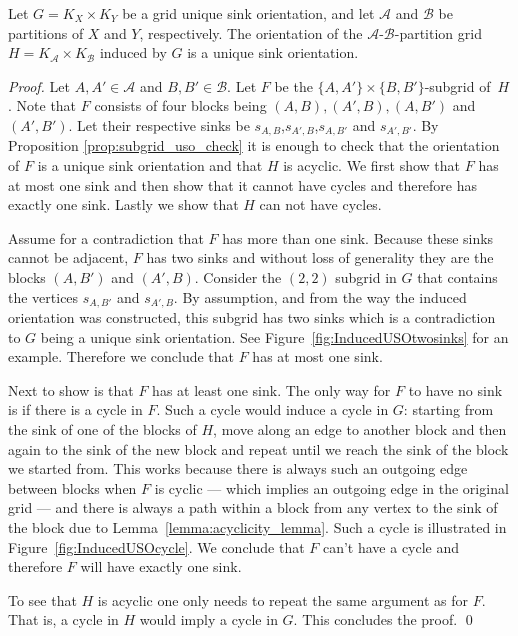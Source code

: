 \documentclass[runningheads,a4paper]{llncs}
\newcommand{\A}{\ensuremath{\mathcal A}}
\newcommand{\B}{\ensuremath{\mathcal B}}
\newcommand{\s}[1]{\ensuremath{s_{\scriptscriptstyle#1}}}
\begin{document}
\begin{lemma}\label{lemma:USO-Lemma}
Let $G = K_X \times K_Y$ be a grid unique sink orientation,
and let $\A$ and $\B$ be partitions of $X$ and $Y$, respectively.
The orientation of the $\A$-$\B$-partition grid $H = K_\A \times K_\B$ induced by $G$ is a unique sink orientation.
\end{lemma}

\begin{proof}
Let $A, A'\in \A$ and $B,B'\in \B$. Let $F$ be the $\{A,A'\}\times\{B, B'\}$-subgrid of~$H$.
Note that $F$ consists of four blocks being $(A,B), (A', B), (A, B')$ and $(A', B')$. Let their respective sinks be $s_{A,B}$,$s_{A',B}$,$s_{A,B'}$ and $s_{A',B'}$.
By Proposition \ref{prop:subgrid_uso_check} it is enough to check that the orientation of $F$ is a unique sink orientation and that $H$ is acyclic.
We first show that $F$ has at most one sink and then show that it cannot have cycles and therefore has exactly one sink. Lastly we show that $H$ can not have cycles.

Assume for a contradiction that $F$ has more than one sink.
Because these sinks cannot be adjacent, $F$ has two sinks and without loss of generality they are the blocks $(A,B')$ and $(A', B)$. Consider the $(2,2)$ subgrid in $G$ that contains the vertices $\s{A,B'}$ and $\s{A',B}$. By assumption, and from the way the induced orientation was constructed, this subgrid has two sinks which is a contradiction to $G$ being a unique sink orientation. See Figure~\ref{fig:InducedUSOtwosinks} for an example. Therefore we conclude that $F$ has at most one sink. 

Next to show is that $F$ has at least one sink. The only way for $F$ to have no sink is if there is a cycle in $F$. Such a cycle would induce a cycle in $G$: starting from the sink of one of the blocks of $H$, move along an edge to another block and then again to the sink of the new block and repeat until we reach the sink of the block we started from. This works because there is always such an outgoing edge between blocks when $F$ is cyclic --- which implies an outgoing edge in the original grid --- and there is always a path within a block from any vertex to the sink of the block due to Lemma~\ref{lemma:acyclicity_lemma}. Such a cycle is illustrated in Figure~\ref{fig:InducedUSOcycle}. We conclude that $F$ can't have a cycle and therefore $F$ will have exactly one sink.

To see that $H$ is acyclic one only needs to repeat the same argument as for $F$. That is, a cycle in $H$ would imply a cycle in $G$. This concludes the proof. \qed


\end{proof}
\end{document}
